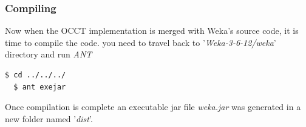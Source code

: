 \documentclass[a4paper,12pt]{article}
\begin{document}
\begin{spacing}{1.5}
\subsubsection{Compiling}
Now when the OCCT implementation is merged with Weka's source code, it is time to compile the code.
you need to travel back to '{\em Weka-3-6-12/weka}' directory and run {\em ANT}
\begin{lstlisting}[language=bash,frame=none,backgroundcolor=\color{anti-flashwhite}]
  $ cd ../../../
  $ ant exejar
\end{lstlisting}
Once compilation is complete an executable jar file {\em weka.jar} was generated in a new folder named '{\em dist}'.

\clearpage

\end{spacing}
\end{document}
